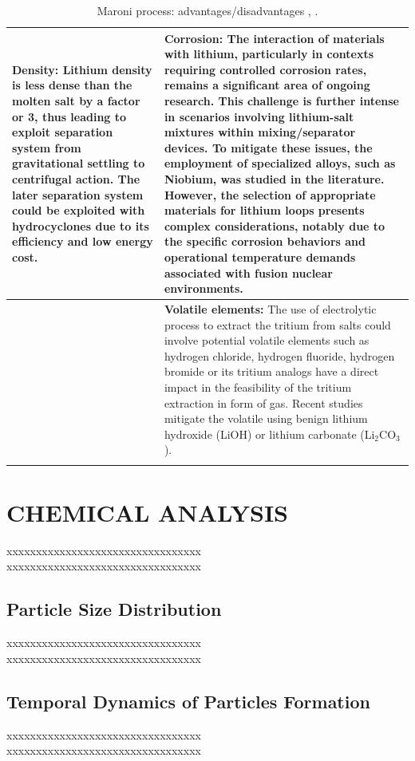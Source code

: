 \begin{longtable}{p{7.5cm}p{7.5cm}}
	\rule[-0.3cm]{0pt}{0.8cm} \textbf{Density:} Lithium density is less dense than the molten salt by a factor or 3, thus leading to exploit separation system from gravitational settling to centrifugal action. The later separation system could be exploited with hydrocyclones due to its efficiency and low energy cost. & \textbf{Corrosion:} The interaction of materials with lithium, particularly in contexts requiring controlled corrosion rates, remains a significant area of ongoing research. This challenge is further intense in scenarios involving lithium-salt mixtures within mixing/separator devices. To mitigate these issues, the employment of specialized alloys, such as Niobium, was studied in the literature. However, the selection of appropriate materials for lithium loops presents complex considerations, notably due to the specific corrosion behaviors and operational temperature demands associated with fusion nuclear environments. \\ \hline
	
	\rule[-0.3cm]{0pt}{0.8cm}  & \textbf{Volatile elements:} The use of electrolytic process to extract the tritium from salts could involve potential volatile elements such as hydrogen chloride, hydrogen fluoride, hydrogen bromide or its tritium analogs have a direct impact in the feasibility of the tritium extraction in form of gas. Recent studies mitigate the volatile using benign lithium hydroxide (LiOH) or lithium carbonate (Li$_2$CO$_3$).  \\ \hline
	\captionsetup{font=bf, size=small}
	\caption{Maroni process: advantages/disadvantages \cite{Maroni1975}, \cite{Bandhauer2013}.}
	\label{ad_dis_maroni}
\end{longtable}

\newpage
\section{CHEMICAL ANALYSIS} \label{sec:chem}%
xxxxxxxxxxxxxxxxxxxxxxxxxxxxxxxxx \\
xxxxxxxxxxxxxxxxxxxxxxxxxxxxxxxxx 


\subsection{Particle Size Distribution}
xxxxxxxxxxxxxxxxxxxxxxxxxxxxxxxxx \\
xxxxxxxxxxxxxxxxxxxxxxxxxxxxxxxxx 

\subsection{Temporal Dynamics of Particles Formation}
xxxxxxxxxxxxxxxxxxxxxxxxxxxxxxxxx \\
xxxxxxxxxxxxxxxxxxxxxxxxxxxxxxxxx 

